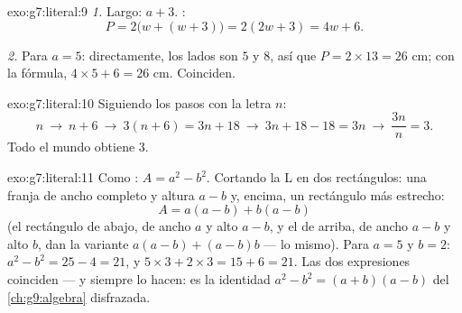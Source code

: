 \begin{solution}{exo:g7:literal:9}
\emph{1.} Largo: $a + 3$. :
\[
P = 2\bigl(w + (w + 3)\bigr) = 2(2w + 3) = 4w + 6 .
\]

\emph{2.} Para $a = 5$: directamente, los lados son $5$ y $8$, así que
$P = 2 \times 13 = 26$ cm; con la fórmula, $4 \times 5 + 6 = 26$ cm.
Coinciden.
\end{solution}

\begin{solution}{exo:g7:literal:10}
Siguiendo los pasos con la letra $n$:
\[
n \ \to\ n + 6 \ \to\ 3(n + 6) = 3n + 18 \ \to\ 3n + 18 - 18 = 3n
\ \to\ \frac{3n}{n} = 3 .
\]
Todo el mundo obtiene $3$.
\end{solution}

\begin{solution}{exo:g7:literal:11}
Como : $A = a^2 - b^2$. Cortando la L en dos
rectángulos: una franja de ancho completo y altura $a - b$ y, encima, un
rectángulo más estrecho:
\[
A = a(a - b) + b(a - b)
\]
(el rectángulo de abajo, de ancho $a$ y alto $a - b$, y el de arriba, de ancho $a - b$
y alto $b$, dan la variante $a(a-b) + (a-b)b$ --- lo mismo).
Para $a = 5$ y $b = 2$: $a^2 - b^2 = 25 - 4 = 21$, y
$5 \times 3 + 2 \times 3 = 15 + 6 = 21$. Las dos expresiones coinciden ---
y siempre lo hacen: es la identidad $a^2 - b^2 = (a + b)(a - b)$ del
\cref{ch:g9:algebra} disfrazada.
\end{solution}

